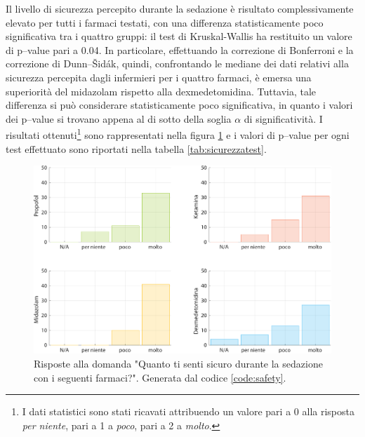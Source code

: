 Il livello di sicurezza percepito durante la sedazione è risultato complessivamente elevato per tutti i farmaci testati, con una differenza statisticamente poco significativa tra i quattro gruppi: il test di Kruskal-Wallis ha restituito un valore di p--value pari a 0.04. In particolare, effettuando la correzione di Bonferroni e la correzione di Dunn--Šidák, quindi, confrontando le mediane dei dati relativi alla sicurezza percepita dagli infermieri per i quattro farmaci, è emersa una superiorità del midazolam rispetto alla dexmedetomidina. Tuttavia, tale differenza si può considerare statisticamente poco significativa, in quanto i valori dei p--value si trovano appena al di sotto della soglia $\alpha$ di significatività. I risultati ottenuti\footnote{I dati statistici sono stati ricavati attribuendo un valore pari a 0 alla risposta \emph{per niente}, pari a 1 a \emph{poco}, pari a 2 a \emph{molto}.} sono rappresentati nella figura \ref{fig:sicurezza1} e i valori di p--value per ogni test effettuato sono riportati nella tabella \ref{tab:sicurezzatest}.

\vfill

\begin{figure}[!h]
    \centering
    \includegraphics[width=1\textwidth]{Figure/sicurezza-istogrammi.pdf}
    \caption{Risposte alla domanda "Quanto ti senti sicuro durante la sedazione con i seguenti farmaci?". Generata dal codice \ref{code:safety}.}
    \label{fig:sicurezza1}
\end{figure}

\vfill

\newpage

